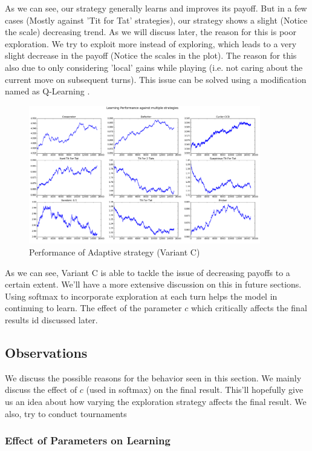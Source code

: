 \documentclass[a4paper]{article}
\begin{document}
	As we can see, our strategy generally learns and improves its payoff. But in a few cases (Mostly against 'Tit for Tat' strategies), our strategy shows a slight (Notice the scale) decreasing trend. As we will discuss later, the reason for this is poor exploration. We try to exploit more instead of exploring, which leads to a very slight decrease in the payoff (Notice the scales in the plot). The reason for this also due to only considering 'local' gains while playing (i.e. not caring about the current move on subsequent turns). This issue can be solved using a modification named as Q-Learning \cite{qlearn}.

	\begin{figure}[H]
	\centering
	\includegraphics[width=0.9\textwidth]{learnerInitialC_b8.png}
	\caption{{Performance of Adaptive strategy (Variant C)}}
	\end{figure}

	As we can see, Variant C is able to tackle the issue of decreasing payoffs to a certain extent. We'll have a more extensive discussion on this in future sections. Using softmax to incorporate exploration at each turn helps the model in continuing to learn. The effect of the parameter $c$ which critically affects the final results id discussed later.  
	
	\subsection{Observations}
	
	We discuss the possible reasons for the behavior seen in this section. We mainly discuss the effect of $c$ (used in softmax) on the final result. This'll hopefully give us an idea about how varying the exploration strategy affects the final result. We also, try to conduct tournaments 	
	
	\subsubsection{Effect of Parameters on Learning}
\end{document}
